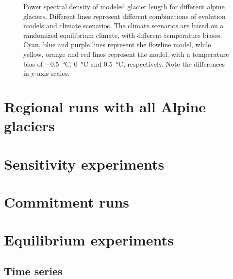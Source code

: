 \begin{figure}[htp]
\begin{subfigure}[b]{0.48\textwidth}
        \end{subfigure}

        \caption{Power spectral density of modeled glacier length for different alpine glaciers. Different lines represent different combinations of evolution models and climate scenarios. The climate scenarios are based on a randomized equilibrium climate, with different temperature biases. Cyan, blue and purple lines represent the flowline model, while yellow, orange and red lines represent the \vas{} model, with a temperature bias of \SI{-.5}{\celsius}, \SI{0}{\celsius} and \SI{+.5}{\celsius}, respectively. Note the differences in y-axis scales.}
        \label{fig:psd}
      \end{figure}
    


  \section{Regional runs with all Alpine glaciers} %
  \label{sec:regional_runs_with_all_alpine_glaciers_results}



  \section{Sensitivity experiments} %
  \label{sec:sensitivity_experiments_results}



  \section{Commitment runs} %
  \label{sec:commitment_runs_results}




\section{Equilibrium experiments} %
\label{sec:equilibrium_experiments_results}
    
    \subsection{Time series} %
    \label{sec:time_series_results}

